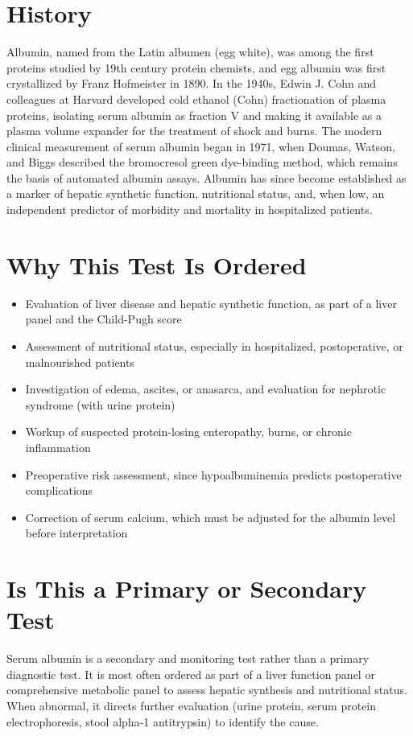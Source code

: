 \section*{History}
Albumin, named from the Latin albumen (egg white), was among the first proteins studied by 19th century protein chemists, and egg albumin was first crystallized by Franz Hofmeister in 1890. In the 1940s, Edwin J. Cohn and colleagues at Harvard developed cold ethanol (Cohn) fractionation of plasma proteins, isolating serum albumin as fraction V and making it available as a plasma volume expander for the treatment of shock and burns. The modern clinical measurement of serum albumin began in 1971, when Doumas, Watson, and Biggs described the bromocresol green dye-binding method, which remains the basis of automated albumin assays. Albumin has since become established as a marker of hepatic synthetic function, nutritional status, and, when low, an independent predictor of morbidity and mortality in hospitalized patients.
\section*{Why This Test Is Ordered}
\begin{itemize}
  \item Evaluation of liver disease and hepatic synthetic function, as part of a liver panel and the Child-Pugh score
  \item Assessment of nutritional status, especially in hospitalized, postoperative, or malnourished patients
  \item Investigation of edema, ascites, or anasarca, and evaluation for nephrotic syndrome (with urine protein)
  \item Workup of suspected protein-losing enteropathy, burns, or chronic inflammation
  \item Preoperative risk assessment, since hypoalbuminemia predicts postoperative complications
  \item Correction of serum calcium, which must be adjusted for the albumin level before interpretation
\end{itemize}
\section*{Is This a Primary or Secondary Test}
Serum albumin is a secondary and monitoring test rather than a primary diagnostic test. It is most often ordered as part of a liver function panel or comprehensive metabolic panel to assess hepatic synthesis and nutritional status. When abnormal, it directs further evaluation (urine protein, serum protein electrophoresis, stool alpha-1 antitrypsin) to identify the cause.
